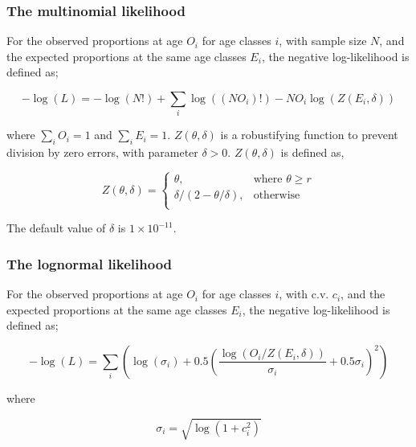 \subsubsection*{The multinomial likelihood}

For the observed proportions at age $O_i$ for age classes $i$, with sample size $N$, and the expected proportions at the same age classes $E_i$, the negative log-likelihood is defined as; 

\begin{equation}
  -\log \left(L \right) =  -\log \left(N! \right) + \sum\limits_i \log \left( \left(NO_i \right)! \right) - NO_i \log \left(Z \left(E_i,\delta \right) \right)
\end{equation}

where $\sum\limits_i O_i = 1$ and $\sum\limits_i E_i = 1$. $Z \left(\theta,\delta \right)$ is a robustifying function to prevent division by zero errors, with parameter $\delta>0$. $Z \left(\theta,\delta \right)$ is defined as,

\begin{equation}
   Z \left(\theta,\delta \right) = \begin{cases}
	  \theta, & \text{where $\theta \ge r$} \\
	  \delta/\left( 2-\theta/\delta \right), & \text{otherwise} \\  
  \end{cases}
\end{equation}

The default value of $\delta$ is $1 \times 10^{-11}$.

\subsubsection*{The lognormal likelihood}

For the observed proportions at age $O_i$ for age classes $i$, with c.v. $c_i$, and the expected proportions at the same age classes $E_i$, the negative log-likelihood is defined as; 

\begin{equation}
 - \log \left(L \right) = \sum\limits_i \left( \log \left( \sigma _i \right) + 0.5\left( \frac{\log \left(O_i / Z \left(E_i,\delta \right) \right)}{\sigma_i} + 0.5 \sigma_i \right)^2 \right)
\end{equation}

where 

\begin{equation}
  \sigma_i  = \sqrt{\log \left(1+c_i^2 \right)}
\end{equation}

